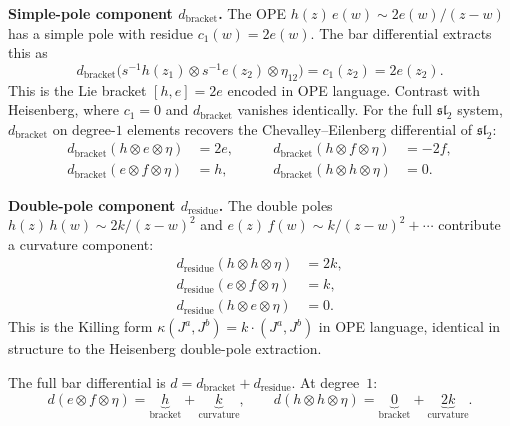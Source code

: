 \medskip\noindent\textbf{Simple-pole component $d_{\mathrm{bracket}}$.}
The OPE $h(z)\,e(w) \sim 2e(w)/(z-w)$ has a simple pole with
residue $c_1(w) = 2e(w)$.  The bar differential extracts this as
\begin{equation}\label{eq:frame-sl2-dbracket-deg1}
d_{\mathrm{bracket}}\bigl(
  s^{-1}h(z_1) \otimes s^{-1}e(z_2) \otimes \eta_{12}
\bigr)
= c_1(z_2) = 2e(z_2).
\end{equation}
This is the Lie bracket $[h, e] = 2e$ encoded in OPE language.
Contrast with Heisenberg, where $c_1 = 0$ and $d_{\mathrm{bracket}}$
vanishes identically.  For the full $\mathfrak{sl}_2$ system,
$d_{\mathrm{bracket}}$ on degree-$1$ elements recovers the
Chevalley--Eilenberg differential of $\mathfrak{sl}_2$:
\begin{equation}\label{eq:frame-sl2-ce-table}
\begin{aligned}
d_{\mathrm{bracket}}(h \otimes e \otimes \eta) &= 2e, &\qquad
d_{\mathrm{bracket}}(h \otimes f \otimes \eta) &= -2f, \\
d_{\mathrm{bracket}}(e \otimes f \otimes \eta) &= h, &\qquad
d_{\mathrm{bracket}}(h \otimes h \otimes \eta) &= 0.
\end{aligned}
\end{equation}

\medskip\noindent\textbf{Double-pole component $d_{\mathrm{residue}}$.}
The double poles $h(z)\,h(w) \sim 2k/(z-w)^2$ and
$e(z)\,f(w) \sim k/(z-w)^2 + \cdots$ contribute a curvature component:
\begin{equation}\label{eq:frame-sl2-dresid-deg1}
\begin{aligned}
d_{\mathrm{residue}}(h \otimes h \otimes \eta) &= 2k, \\
d_{\mathrm{residue}}(e \otimes f \otimes \eta) &= k, \\
d_{\mathrm{residue}}(h \otimes e \otimes \eta) &= 0.
\end{aligned}
\end{equation}
This is the Killing form $\kappa(J^a, J^b) = k \cdot (J^a, J^b)$
in OPE language, identical in structure to the Heisenberg double-pole
extraction.

The full bar differential is $d = d_{\mathrm{bracket}} + d_{\mathrm{residue}}$.
At degree~$1$:
\begin{equation}\label{eq:frame-sl2-full-d-deg1}
d(e \otimes f \otimes \eta) = \underbrace{h}_{\text{bracket}} + \underbrace{k}_{\text{curvature}}, \qquad
d(h \otimes h \otimes \eta) = \underbrace{0}_{\text{bracket}} + \underbrace{2k}_{\text{curvature}}.
\end{equation}

